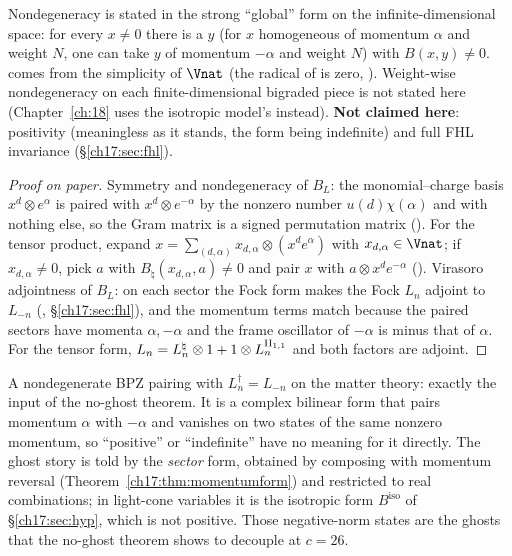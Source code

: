 \begin{dictionary}
Nondegeneracy is stated in the strong ``global'' form on the infinite-dimensional space: for every $x\ne0$ there is a
$y$ (for $x$ homogeneous of momentum $\alpha$ and weight $N$, one can take $y$ of momentum $-\alpha$ and weight $N$) with $B(x,y)\ne0$.   comes
from the simplicity of $\Vnat$ (the radical of  is zero, ).  Weight-wise
nondegeneracy on each finite-dimensional bigraded piece is not stated here (Chapter~\ref{ch:18} uses the isotropic
model's  instead).  \textbf{Not claimed here}: positivity (meaningless as it stands, the form being
indefinite) and full FHL invariance (\S\ref{ch17:sec:fhl}).
\end{dictionary}

\begin{proof}[Proof on paper]
Symmetry and nondegeneracy of $B_L$: the monomial--charge basis $x^d\otimes e^\alpha$ is paired with $x^d\otimes e^{-\alpha}$ by the
nonzero number $u(d)\chi(\alpha)$ and with nothing else, so the Gram matrix is a signed permutation matrix
().  For the tensor product, expand $x=\sum_{(d,\alpha)}x_{d,\alpha}\otimes(x^d e^\alpha)$ with
$x_{d,\alpha}\in\Vnat$; if $x_{d,\alpha}\ne0$, pick $a$ with $B_\natural(x_{d,\alpha},a)\ne0$ and pair $x$ with $a\otimes x^de^{-\alpha}$
().  Virasoro adjointness of $B_L$: on each sector the Fock form makes the Fock
$L_n$ adjoint to $L_{-n}$ (, \S\ref{ch17:sec:fhl}), and the momentum terms match because the
paired sectors have momenta $\alpha,-\alpha$ and the frame oscillator of $-\alpha$ is minus that of $\alpha$.  For the tensor form,
$L_n=L^\natural_n\otimes1+1\otimes L^{{\mathrm{II}_{1,1}}}_n$ and both factors are adjoint.
\end{proof}

\begin{physics}
A nondegenerate BPZ pairing with $L_n^\dagger=L_{-n}$ on the matter theory: exactly the input of the no-ghost theorem.
It is a complex bilinear form that pairs momentum $\alpha$ with $-\alpha$ and vanishes on two states of the same nonzero
momentum, so ``positive'' or ``indefinite'' have no meaning for it directly.  The ghost story is told by the
\emph{sector} form, obtained by composing with momentum reversal (Theorem~\ref{ch17:thm:momentumform}) and restricted to
real combinations; in light-cone variables it is the isotropic form $B^{\mathrm{iso}}$ of \S\ref{ch17:sec:hyp}, which is
not positive.  Those negative-norm states are the ghosts that the no-ghost theorem shows to decouple at $c=26$.
\end{physics}


